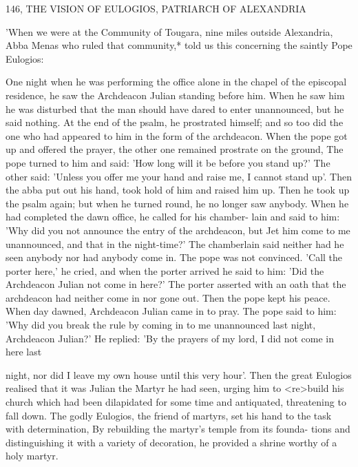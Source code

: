 146, THE VISION OF EULOGIOS,
PATRIARCH OF ALEXANDRIA

'When we were at the Community of Tougara, nine miles outside
Alexandria, Abba Menas who ruled that community,* told us this
concerning the saintly Pope Eulogios:

One night when he was performing the office alone in the chapel of
the episcopal residence, he saw the Archdeacon Julian standing
before him.
When he saw him he was disturbed that the man should
have dared to enter unannounced, but he said nothing.
At the end
of the psalm, he prostrated himself; and so too did the one who had
appeared to him in the form of the archdeacon.
When the pope got
up and offered the prayer, the other one remained prostrate on the
ground, The pope turned to him and said: 'How long will it be
before you stand up?' The other said: 'Unless you offer me your
hand and raise me, I cannot stand up'.
Then the abba put out his
hand, took hold of him and raised him up.
Then he took up the
psalm again; but when he turned round, he no longer saw anybody.
When he had completed the dawn office, he called for his chamber-
lain and said to him: 'Why did you not announce the entry of the
archdeacon, but Jet him come to me unannounced, and that in the
night-time?' The chamberlain said neither had he seen anybody nor
had anybody come in.
The pope was not convinced.
'Call the porter
here,' he cried, and when the porter arrived he said to him: 'Did the
Archdeacon Julian not come in here?' The porter asserted with an
oath that the archdeacon had neither come in nor gone out.
Then
the pope kept his peace.
When day dawned, Archdeacon Julian
came in to pray.
The pope said to him: 'Why did you break the rule
by coming in to me unannounced last night, Archdeacon Julian?' He
replied: 'By the prayers of my lord, I did not come in here last

night, nor did I leave my own house until this very hour'.
Then the
great Eulogios realised that it was Julian the Martyr he had seen,
urging him to <re>build his church which had been dilapidated for
some time and antiquated, threatening to fall down.
The godly
Eulogios, the friend of martyrs, set his hand to the task with
determination, By rebuilding the martyr's temple from its founda-
tions and distinguishing it with a variety of decoration, he provided
a shrine worthy of a holy martyr.


